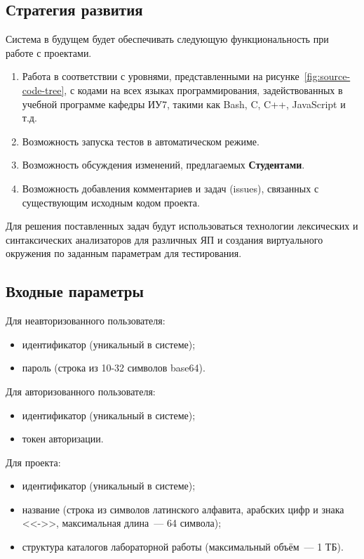 \documentclass{bmstu}
\begin{document}
  \subsection{Стратегия развития}

  Система в будущем будет обеспечивать следующую функциональность при работе с
  проектами.
  \begin{enumerate}[label*=\arabic*.]
    \item Работа в соответствии с уровнями, представленными на
      рисунке~\ref{fig:source-code-tree}, с кодами на всех языках
      программирования, задействованных в учебной программе кафедры
      ИУ7, такими как Bash, C, C++, JavaScript и т.д.
    \item Возможность запуска тестов в автоматическом режиме.
    \item Возможность обсуждения изменений, предлагаемых \textbf{Студентами}.
    \item Возможность добавления комментариев и задач (issues),
      связанных с существующим исходным кодом проекта.
  \end{enumerate}

  Для решения поставленных задач будут использоваться технологии лексических
  и синтаксических анализаторов для различных ЯП и создания виртуального окружения
  по заданным параметрам для тестирования. 

  \subsection{Входные параметры}

  Для неавторизованного пользователя:
  \begin{itemize}[label=---]
    \item идентификатор (уникальный в системе);
    \item пароль (строка из 10-32 символов base64).
  \end{itemize}

  Для авторизованного пользователя:
  \begin{itemize}[label=---]
    \item идентификатор (уникальный в системе);
    \item токен авторизации.
  \end{itemize}

  Для проекта:
  \begin{itemize}[label=---]
    \item идентификатор (уникальный в системе);
    \item название (строка из символов латинского алфавита, арабских
      цифр и знака <<->>, максимальная длина~--- 64 символа);
    \item структура каталогов лабораторной работы (максимальный
      объём~--- 1 ТБ).
  \end{itemize}
\end{document}
